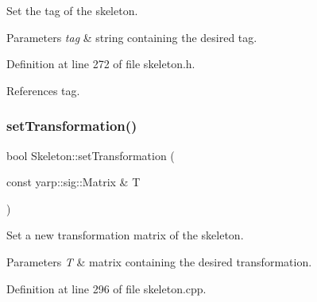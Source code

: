Set the tag of the skeleton. 


\begin{DoxyParams}{Parameters}
{\em tag} & string containing the desired tag. \\
\hline
\end{DoxyParams}


Definition at line 272 of file skeleton.\+h.


\begin{DoxyCode}{0}

\end{DoxyCode}


References tag.

\mbox{\label{classassistive__rehab_1_1Skeleton_a3486cbd7f59e75c1d9ef26cbc05bb72f}} 
\subsubsection{\texorpdfstring{setTransformation()}{setTransformation()}}
{\footnotesize\ttfamily bool Skeleton\+::set\+Transformation (\begin{DoxyParamCaption}\item[{const yarp\+::sig\+::\+Matrix \&}]{T }\end{DoxyParamCaption})}



Set a new transformation matrix of the skeleton. 


\begin{DoxyParams}{Parameters}
{\em T} & matrix containing the desired transformation. \\
\hline
\end{DoxyParams}


Definition at line 296 of file skeleton.\+cpp.


\begin{DoxyCode}{0}

\end{DoxyCode}


